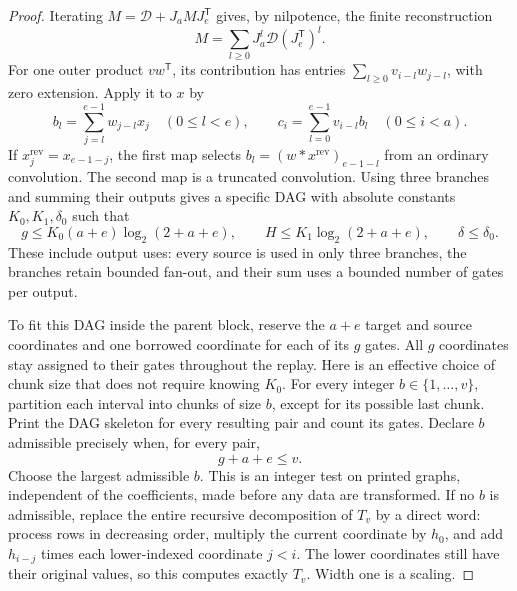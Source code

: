 \begin{proof}
Iterating $M=\mathcal D+J_aMJ_e^{\mathsf T}$ gives, by nilpotence,
the finite reconstruction
\begin{equation}\label{loc:reconstruction}
 M=\sum_{l\ge0}J_a^l\mathcal D(J_e^{\mathsf T})^l.
\end{equation}
For one outer product $vw^{\mathsf T}$, its contribution has entries
$\sum_{l\ge0}v_{i-l}w_{j-l}$, with zero extension.  Apply it to $x$ by
\begin{equation}\label{loc:two-convolutions}
 b_l=\sum_{j=l}^{e-1}w_{j-l}x_j\quad(0\le l<e),\qquad
 c_i=\sum_{l=0}^{e-1}v_{i-l}b_l\quad(0\le i<a).
\end{equation}
If $x^{\mathrm{rev}}_j=x_{e-1-j}$, the first map selects
$b_l=(w*x^{\mathrm{rev}})_{e-1-l}$ from an ordinary convolution.
The second map is a truncated convolution.  Using three
branches and summing their outputs gives a specific DAG with absolute
constants $K_0,K_1,\delta_0$ such that
\begin{equation}\label{loc:chunk-bounds}
 g\le K_0(a+e)\log_2(2+a+e),\qquad
 H\le K_1\log_2(2+a+e),\qquad \delta\le\delta_0.
\end{equation}
These include output uses: every source is used in only three
branches, the branches retain bounded fan-out, and their sum uses a
bounded number of gates per output.

To fit this DAG inside the parent block, reserve the $a+e$ target and
source coordinates and one borrowed coordinate for each of its $g$
gates.  All $g$ coordinates stay assigned to their gates throughout
the replay.  Here is an effective choice of chunk size that does not
require knowing $K_0$.  For every integer $b\in\{1,\ldots,v\}$, partition
each interval into chunks of size $b$, except for its possible last chunk.
Print the DAG skeleton for every resulting pair and count its gates.
Declare $b$ admissible precisely when, for every pair,
\begin{equation}\label{loc:fit}
 g+a+e\le v.
\end{equation}
Choose the largest admissible $b$.  This is an integer test on printed
graphs, independent of the coefficients, made before any data are
transformed.  If no $b$ is admissible, replace the entire recursive
decomposition of $T_v$ by a direct word: process rows in decreasing
order, multiply the current coordinate by $h_0$, and add $h_{i-j}$
times each lower-indexed coordinate $j<i$.  The lower coordinates
still have their original values, so this computes exactly $T_v$.
Width one is a scaling.


\end{proof}
